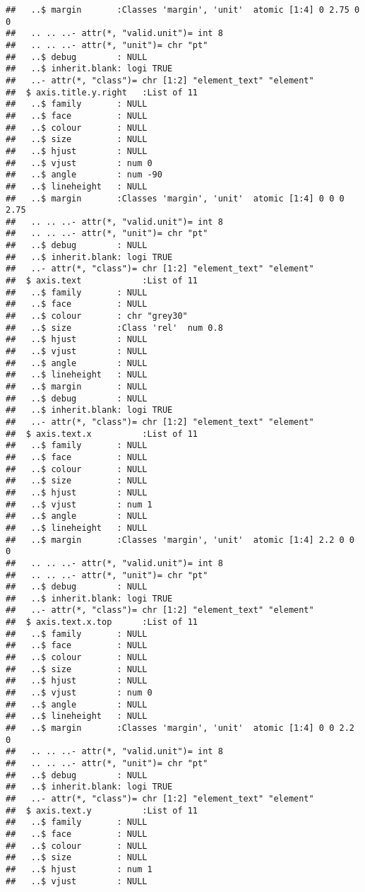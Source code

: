 \documentclass[]{article}
\begin{document}
\begin{verbatim}
##   ..$ margin       :Classes 'margin', 'unit'  atomic [1:4] 0 2.75 0 0
##   .. .. ..- attr(*, "valid.unit")= int 8
##   .. .. ..- attr(*, "unit")= chr "pt"
##   ..$ debug        : NULL
##   ..$ inherit.blank: logi TRUE
##   ..- attr(*, "class")= chr [1:2] "element_text" "element"
##  $ axis.title.y.right   :List of 11
##   ..$ family       : NULL
##   ..$ face         : NULL
##   ..$ colour       : NULL
##   ..$ size         : NULL
##   ..$ hjust        : NULL
##   ..$ vjust        : num 0
##   ..$ angle        : num -90
##   ..$ lineheight   : NULL
##   ..$ margin       :Classes 'margin', 'unit'  atomic [1:4] 0 0 0 2.75
##   .. .. ..- attr(*, "valid.unit")= int 8
##   .. .. ..- attr(*, "unit")= chr "pt"
##   ..$ debug        : NULL
##   ..$ inherit.blank: logi TRUE
##   ..- attr(*, "class")= chr [1:2] "element_text" "element"
##  $ axis.text            :List of 11
##   ..$ family       : NULL
##   ..$ face         : NULL
##   ..$ colour       : chr "grey30"
##   ..$ size         :Class 'rel'  num 0.8
##   ..$ hjust        : NULL
##   ..$ vjust        : NULL
##   ..$ angle        : NULL
##   ..$ lineheight   : NULL
##   ..$ margin       : NULL
##   ..$ debug        : NULL
##   ..$ inherit.blank: logi TRUE
##   ..- attr(*, "class")= chr [1:2] "element_text" "element"
##  $ axis.text.x          :List of 11
##   ..$ family       : NULL
##   ..$ face         : NULL
##   ..$ colour       : NULL
##   ..$ size         : NULL
##   ..$ hjust        : NULL
##   ..$ vjust        : num 1
##   ..$ angle        : NULL
##   ..$ lineheight   : NULL
##   ..$ margin       :Classes 'margin', 'unit'  atomic [1:4] 2.2 0 0 0
##   .. .. ..- attr(*, "valid.unit")= int 8
##   .. .. ..- attr(*, "unit")= chr "pt"
##   ..$ debug        : NULL
##   ..$ inherit.blank: logi TRUE
##   ..- attr(*, "class")= chr [1:2] "element_text" "element"
##  $ axis.text.x.top      :List of 11
##   ..$ family       : NULL
##   ..$ face         : NULL
##   ..$ colour       : NULL
##   ..$ size         : NULL
##   ..$ hjust        : NULL
##   ..$ vjust        : num 0
##   ..$ angle        : NULL
##   ..$ lineheight   : NULL
##   ..$ margin       :Classes 'margin', 'unit'  atomic [1:4] 0 0 2.2 0
##   .. .. ..- attr(*, "valid.unit")= int 8
##   .. .. ..- attr(*, "unit")= chr "pt"
##   ..$ debug        : NULL
##   ..$ inherit.blank: logi TRUE
##   ..- attr(*, "class")= chr [1:2] "element_text" "element"
##  $ axis.text.y          :List of 11
##   ..$ family       : NULL
##   ..$ face         : NULL
##   ..$ colour       : NULL
##   ..$ size         : NULL
##   ..$ hjust        : num 1
##   ..$ vjust        : NULL

\end{verbatim}
\end{document}
